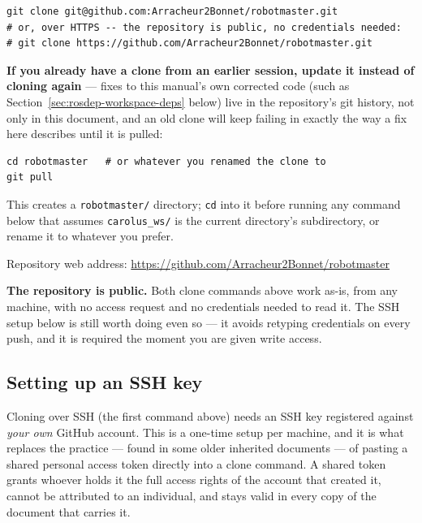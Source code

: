 \documentclass[11pt]{report}
\begin{document}
\begin{lstlisting}[style=shell]
git clone git@github.com:Arracheur2Bonnet/robotmaster.git
# or, over HTTPS -- the repository is public, no credentials needed:
# git clone https://github.com/Arracheur2Bonnet/robotmaster.git
\end{lstlisting}

\textbf{If you already have a clone from an earlier session, update it
instead of cloning again} --- fixes to this manual's own corrected code
(such as Section~\ref{sec:rosdep-workspace-deps} below) live in the
repository's git history, not only in this document, and an old clone
will keep failing in exactly the way a fix here describes until it is
pulled:
\begin{lstlisting}[style=shell]
cd robotmaster   # or whatever you renamed the clone to
git pull
\end{lstlisting}

This creates a \texttt{robotmaster/} directory; \texttt{cd} into it before
running any command below that assumes \texttt{carolus\_ws/} is the current
directory's subdirectory, or rename it to whatever you prefer.

Repository web address:
\url{https://github.com/Arracheur2Bonnet/robotmaster}

\textbf{The repository is public.} Both clone commands above work as-is,
from any machine, with no access request and no credentials needed to
read it. The SSH setup below is still worth doing even so --- it avoids
retyping credentials on every push, and it is required the moment you are
given write access.

\subsection{Setting up an SSH key}

Cloning over SSH (the first command above) needs an SSH key registered
against \emph{your own} GitHub account. This is a one-time setup per
machine, and it is what replaces the practice --- found in some older
inherited documents --- of pasting a shared personal access token directly
into a clone command. A shared token grants whoever holds it the full
access rights of the account that created it, cannot be attributed to an
individual, and stays valid in every copy of the document that carries it.
\end{document}
